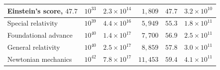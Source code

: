 \documentclass{article}
\begin{document}
\begin{table}[ht]
\begin{tabular}{l r r r r r}
    Einstein's score, $47.7$ & $10^{33}$ & $2.3 \times 10^{14}$ & $1{,}809$ & $47.7$ & $3.2 \times 10^{10}$ \\
    \hline
    Special relativity & $10^{39}$ & $4.4 \times 10^{16}$ & $5{,}949$ & $55.3$ & $1.8 \times 10^{11}$ \\
    Foundational advance & $10^{40}$ & $1.4 \times 10^{17}$ & $7{,}700$ & $56.9$ & $2.5 \times 10^{11}$ \\
    General relativity & $10^{40}$ & $2.5 \times 10^{17}$ & $8{,}859$ & $57.8$ & $3.0 \times 10^{11}$ \\
    Newtonian mechanics & $10^{42}$ & $7.8 \times 10^{17}$ & $11{,}453$ & $59.4$ & $4.1 \times 10^{11}$ \\
    \hline
  \end{tabular}
\end{table}
\end{document}
